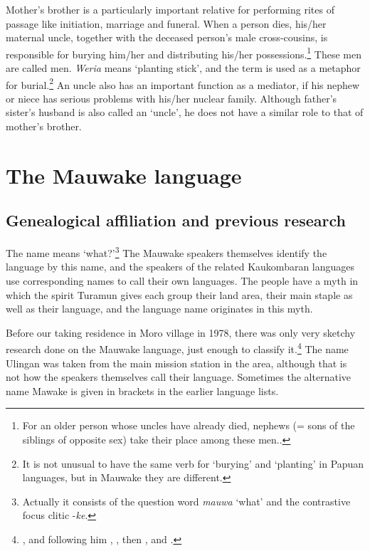 Mother's brother is a particularly important relative for performing rites of passage like initiation, marriage and funeral. When a person dies, his/her maternal uncle, together with the deceased person's male cross-cousins, is responsible for burying him/her and distributing his/her possessions.\footnote{For an older person whose uncles have already died, nephews (= sons of the siblings of opposite sex) take their place among these men..} These men are called  men.  \textit{Weria} means `planting stick', and the term is used as a metaphor for burial.\footnote{It is not unusual to have the same verb for `burying' and `planting' in Papuan languages, but in Mauwake they are different.} An uncle also has an important function as a mediator, if his nephew or niece has serious problems with his/her nuclear family. Although father's sister's husband is also called an `uncle', he does not have a similar role to that of mother's brother.  

\section{The Mauwake language}
\subsection{Genealogical affiliation and previous research}\label{sec:1.4.1:geneological}
The name  means `what?'\footnote{Actually it consists of the question word \textit{mauwa} `what' and the contrastive focus clitic -\textit{ke}.}  The Mauwake speakers themselves identify the language by this name, and the speakers of the related Kaukombaran languages use corresponding names to call their own languages.  The people have a myth in which the spirit Turamun gives each group their land area, their main staple as well as their language, and the language name originates in this myth.

Before our taking residence in Moro village in 1978, there was only very sketchy research done on the Mauwake language, just enough to classify it.\footnote{\citet{Capell1952}, and following him \citet{VoegelinEtAl1965}, \citet{Greenberg1971}, then \citet{ZGraggen1971,ZGraggen1975a}, \citet{Wurm1975,Wurm1982} and \citet{Hattori1981}.} The name Ulingan was taken from the main mission station in the area, although that is not how the speakers themselves call their language. Sometimes the alternative name Mawake is given in brackets in the earlier language lists.  

